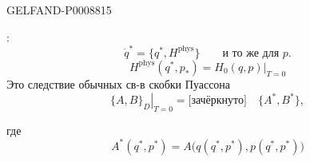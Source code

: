 \begin{GelfandAdjacentEvidence}{GELFAND-P000881}{5}


:
\begin{equation*}
\dot q^*=\{q^*,H^{\mathrm{phys}}\}\qquad\text{и то же для }p.
\tag{18}
\end{equation*}
\begin{equation*}
H^{\mathrm{phys}}(q^*,p_*)=\left.H_0(q,p)\right|_{T=0}
\tag{19}
\end{equation*}
Это следствие обычных св-в скобки Пуассона
\begin{equation*}
\left.\{A,B\}_D\right|_{T=0}=\text{[зачёркнуто]}\quad\{A^*,B^*\},
\tag{20}
\end{equation*}
\end{GelfandAdjacentEvidence}


где
\begin{equation*}
A^*(q^*,p^*)=A\bigl(q(q^*,p^*),p(q^*,p^*)\bigr)
\tag{21}
\end{equation*}


